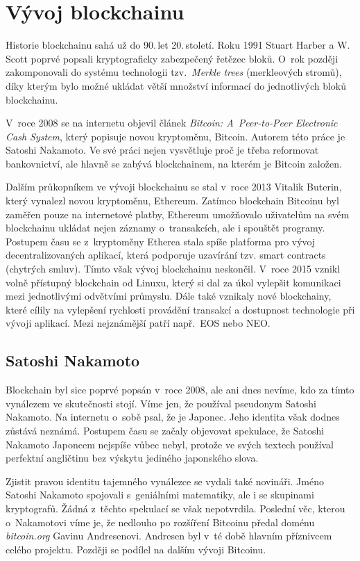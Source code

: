 \documentclass[12pt]{report}			%
\begin{document}
		\section{Vývoj blockchainu}{
Historie blockchainu sahá už do 90.\,let 20.\,století. Roku 1991 Stuart Harber a W. Scott poprvé popsali kryptograficky zabezpečený řetězec bloků. O~rok později zakomponovali do systému technologii tzv.\, \textit{Merkle trees} (merkleových stromů), díky kterým bylo možné ukládat větší množství informací do jednotlivých bloků blockchainu. \cite{Iredale2020} 

V~roce 2008 se na internetu objevil článek {\it Bitcoin: A~Peer-to-Peer Electronic Cash System}, který popisuje novou kryptoměnu, Bitcoin. Autorem této práce je Satoshi Nakamoto. Ve své práci nejen vysvětluje proč je třeba reformovat bankovnictví, ale hlavně se zabývá blockchainem, na kterém je Bitcoin založen. \cite{Stroukal2021}

Dalším průkopníkem ve vývoji blockchainu se stal v~roce 2013 Vitalik Buterin, který vynalezl novou kryptoměnu, Ethereum. Zatímco blockchain Bitcoinu byl zaměřen pouze na internetové platby, Ethereum umožňovalo uživatelům na svém blockchainu ukládat nejen záznamy o~transakcích, ale i spouštět programy. Postupem času se z~kryptoměny Etherea stala spíše platforma pro vývoj decentralizovaných aplikací, která podporuje uzavírání tzv. smart contracts (chytrých smluv). Tímto však vývoj blockchainu neskončil. V~roce 2015 vznikl volně přístupný blockchain od Linuxu, který si dal za úkol vylepšit komunikaci mezi jednotlivými odvětvími průmyslu. Dále také vznikaly nové blockchainy, které cílily na vylepšení rychlosti provádění transakcí a dostupnost technologie při vývoji aplikací. Mezi nejznámější patří např.\, EOS nebo NEO. \cite{Iredale2020}
}
		\subsection{Satoshi Nakamoto}{
Blockchain byl sice poprvé popsán v~roce 2008, ale ani dnes nevíme, kdo za tímto vynálezem ve skutečnosti stojí. Víme jen, že používal pseudonym Satoshi Nakamoto. Na internetu o~sobě psal, že je Japonec. Jeho identita však dodnes zůstává neznámá. Postupem času se začaly objevovat spekulace, že Satoshi Nakamoto Japoncem nejspíše vůbec nebyl, protože ve svých textech používal perfektní angličtinu bez výskytu jediného japonského slova. 

Zjistit pravou identitu tajemného vynálezce se vydali také novináři. Jméno Satoshi Nakamoto spojovali s~geniálními matematiky, ale i se skupinami kryptografů. Žádná z~těchto spekulací se však nepotvrdila. Poslední věc, kterou o~Nakamotovi víme je, že nedlouho po rozšíření Bitcoinu předal doménu {\it bitcoin.org} Gavinu Andresenovi. Andresen byl v~té době hlavním příznivcem celého projektu. Později se podílel na dalším vývoji Bitcoinu.\cite{Stroukal2021}
}
\end{document}
